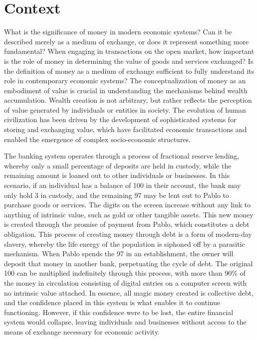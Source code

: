 \section{Context}
What is the significance of money in modern economic systems? Can it be described merely as a medium of exchange, or does it represent something more fundamental? When engaging in transactions on the open market, how important is the role of money in determining the value of goods and services exchanged? Is the definition of money as a medium of exchange sufficient to fully understand its role in contemporary economic systems? The conceptualization of money as an embodiment of value is crucial in understanding the mechanisms behind wealth accumulation. Wealth creation is not arbitrary, but rather reflects the perception of value generated by individuals or entities in society. The evolution of human civilization has been driven by the development of sophisticated systems for storing and exchanging value, which have facilitated economic transactions and enabled the emergence of complex socio-economic structures. 

The banking system operates through a process of fractional reserve lending, whereby only a small percentage of deposits are held in custody, while the remaining amount is loaned out to other individuals or businesses. In this scenario, if an individual has a balance of 100 in their account, the bank may only hold 3 in custody, and the remaining 97 may be lent out to Pablo to purchase goods or services. The digits on the screen increase without any link to anything of intrinsic value, such as gold or other tangible assets. This new money is created through the promise of payment from Pablo, which constitutes a debt obligation. This process of creating money through debt is a form of modern-day slavery, whereby the life energy of the population is siphoned off by a parasitic mechanism. When Pablo spends the 97 in an establishment, the owner will deposit that money in another bank, perpetuating the cycle of debt. The original 100 can be multiplied indefinitely through this process, with more than 90\% of the money in circulation consisting of digital entries on a computer screen with no intrinsic value attached. In essence, all magic money created is collective debt, and the confidence placed in this system is what enables it to continue functioning. However, if this confidence  were to be lost, the entire financial system would collapse, leaving individuals and businesses without access to the means of exchange necessary for economic activity.

